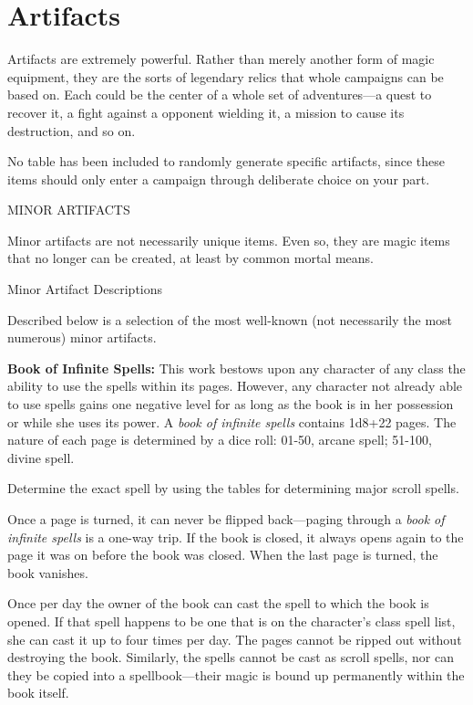 
\section{Artifacts}

Artifacts are extremely powerful. Rather than merely another form of magic equipment, 
they are the sorts of legendary relics that whole campaigns can be based on. Each 
could be the center of a whole set of adventures---a quest to recover it, a fight 
against a opponent wielding it, a mission to cause its destruction, and so on.

No table has been included to randomly generate specific artifacts, since these 
items should only enter a campaign through deliberate choice on your part.

\vspace{12pt}
MINOR ARTIFACTS

Minor artifacts are not necessarily unique items. Even so, they are magic items 
that no longer can be created, at least by common mortal means.

\vspace{12pt}
Minor Artifact Descriptions

Described below is a selection of the most well-known (not necessarily the most 
numerous) minor artifacts.

\vspace{12pt}
\textbf{Book of Infinite Spells:} This work bestows upon any character of any class 
the ability to use the spells within its pages. However, any character not already 
able to use spells gains one negative level for as long as the book is in her possession 
or while she uses its power. A \textit{book of infinite spells }contains 1d8+22 
pages. The nature of each page is determined by a dice roll: 01-50, arcane spell; 
51-100, divine spell.

Determine the exact spell by using the tables for determining major scroll spells.

Once a page is turned, it can never be flipped back---paging through a \textit{book 
of infinite spells }is a one-way trip. If the book is closed, it always opens again 
to the page it was on before the book was closed. When the last page is turned, 
the book vanishes.

Once per day the owner of the book can cast the spell to which the book is opened. 
If that spell happens to be one that is on the character's class spell list, she 
can cast it up to four times per day. The pages cannot be ripped out without destroying 
the book. Similarly, the spells cannot be cast as scroll spells, nor can they be 
copied into a spellbook---their magic is bound up permanently within the book itself.


